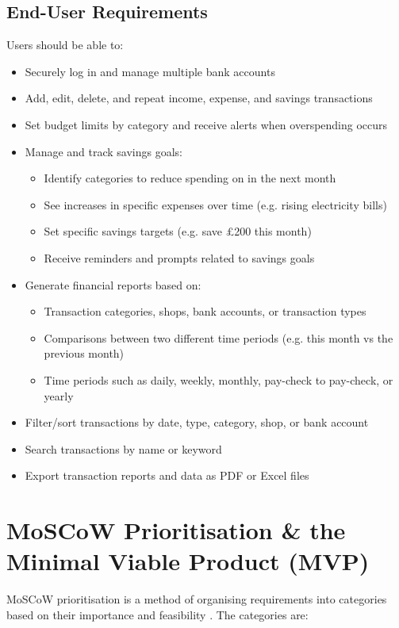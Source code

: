 \documentclass{l4proj}
\begin{document}
\subsection{End-User Requirements}
Users should be able to:
\begin{itemize}[noitemsep, topsep=0pt]
    \item Securely log in and manage multiple bank accounts
    \item Add, edit, delete, and repeat income, expense, and savings transactions
    \item Set budget limits by category and receive alerts when overspending occurs
    \item Manage and track savings goals:
    \begin{itemize}
        \item Identify categories to reduce spending on in the next month
        \item See increases in specific expenses over time (e.g. rising electricity bills)
        \item Set specific savings targets (e.g. save £200 this month)
        \item Receive reminders and prompts related to savings goals
    \end{itemize}
    \item Generate financial reports based on:
    \begin{itemize}
        \item Transaction categories, shops, bank accounts, or transaction types
        \item Comparisons between two different time periods (e.g. this month vs the previous month)
        \item Time periods such as daily, weekly, monthly, pay-check to pay-check, or yearly
    \end{itemize}
    \item Filter/sort transactions by date, type, category, shop, or bank account
    \item Search transactions by name or keyword
    \item Export transaction reports and data as PDF or Excel files
\end{itemize}


\section{MoSCoW Prioritisation \& the Minimal Viable Product (MVP)}

MoSCoW prioritisation is a method of organising requirements into categories based on their importance and feasibility \citep{productplan_moscow_nodate}. The categories are:
\end{document}
